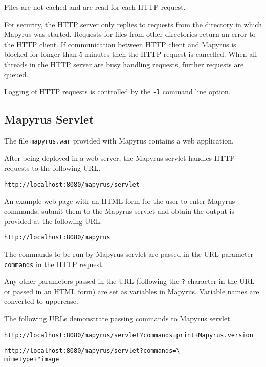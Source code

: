 Files are not cached and are read for each HTTP request.

For security, the HTTP server only replies to requests
from the directory in which Mapyrus was started.
Requests for files from other directories return an error to the HTTP client.
If communication between HTTP client and Mapyrus is blocked for longer than
5 minutes then the HTTP request is cancelled.
When all threads in the HTTP server are busy handling requests,
further requests are queued.

Logging of HTTP requests is controlled by the \texttt{-l} command line option.

\subsection{Mapyrus Servlet}

The file \texttt{mapyrus.war} provided with Mapyrus
contains a web application.

After being deployed in a web server, the Mapyrus servlet handles HTTP
requests to the following URL.

\begin{verbatim}
http://localhost:8080/mapyrus/servlet
\end{verbatim}

An example web page with an HTML form for the user
to enter Mapyrus commands, submit them to the Mapyrus servlet
and obtain the output is provided at the following URL.

\begin{verbatim}
http://localhost:8080/mapyrus
\end{verbatim}

The commands to be run by Mapyrus servlet are passed in
the URL parameter \texttt{commands} in the HTTP request.

Any other parameters passed in the URL (following the \texttt{?} character
in the URL or passed in an HTML form) are set as variables in Mapyrus.
Variable names are converted to uppercase.

The following URLs demonstrate passing commands to Mapyrus servlet.

\begin{alltt}
http://localhost:8080/mapyrus/servlet?commands=print+Mapyrus.version
\end{alltt}
\begin{alltt}
http://localhost:8080/mapyrus/servlet?commands= \textbackslash
  mimetype+"image%2Fpng"%0Dnewpage+"png"%2C"-"%2C50%2C50%2C"background%3Dred"
\end{alltt}

